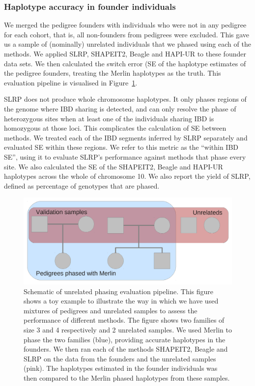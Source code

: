 \clearpage
\subsubsection{Haplotype accuracy in founder individuals}
We merged the pedigree founders with individuals who were not in any pedigree for each cohort, that is, all non-founders from pedigrees were excluded.  This gave us a sample of (nominally) unrelated individuals that we phased using each of the methods.  We applied SLRP, SHAPEIT2, Beagle and HAPI-UR to these founder data sets. We then calculated the switch error (SE of the haplotype estimates of the pedigree founders, treating the Merlin haplotypes as the truth.  This evaluation pipeline is visualised in Figure~\ref{fig:phasing_schematic}.

SLRP does not produce whole chromosome haplotypes. It only phases regions of the genome where IBD sharing is detected, and can only resolve the phase of heterozygous sites when at least one of the individuals sharing IBD is homozygous at those loci. This complicates the calculation of SE between methods. We treated each of the IBD segments inferred by SLRP separately and evaluated SE within these regions. We refer to this metric as the ``within IBD SE'', using it to evaluate SLRP's performance against methods that phase every site. We also calculated the SE of the SHAPEIT2, Beagle and HAPI-UR haplotypes across the whole of chromosome 10. We also report the yield of SLRP, defined as percentage of genotypes that are phased.

\begin{figure}[h]
  \begin{center} 
   \includegraphics[width=.8\textwidth]{chap4figs/phasing_schematic}%
  \end{center} 
\caption[Schematic of unrelated phasing evaluation pipeline]{Schematic of unrelated phasing evaluation pipeline. This figure shows a toy example to illustrate the way in which we have used mixtures of pedigrees and unrelated samples to assess the performance of different methods. The figure shows two families of size 3 and 4 respectively and 2 unrelated samples. We used Merlin to phase the two families (blue), providing accurate haplotypes in the founders. We then ran each of the methods SHAPEIT2, Beagle and SLRP on the data from the founders and the unrelated samples (pink). The haplotypes estimated in the founder individuals was then compared to the Merlin phased haplotypes from these samples.\label{fig:phasing_schematic}}
\end{figure}


